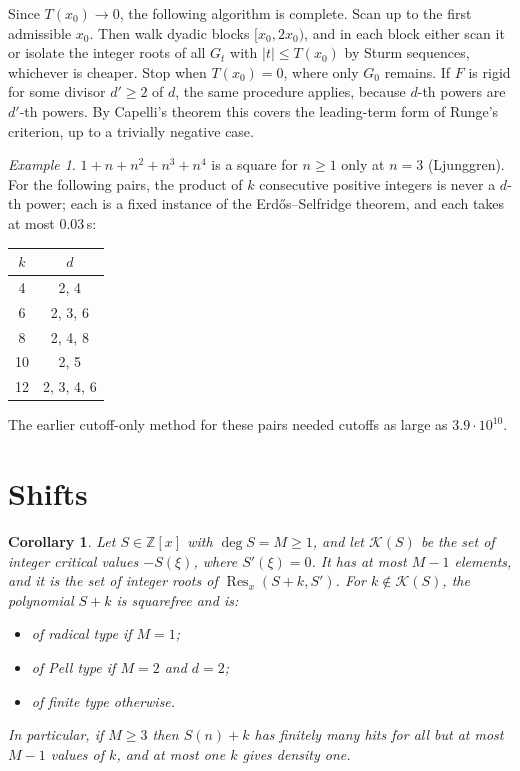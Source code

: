 \documentclass[11pt]{amsart}
\newtheorem{corollary}[theorem]{Corollary}
\theoremstyle{definition}
\theoremstyle{remark}
\newtheorem{example}[theorem]{Example}
\newcommand{\Z}{\mathbb{Z}}
\begin{document}
Since $T(x_0)\to0$, the following algorithm is complete. Scan up to the first admissible $x_0$. Then walk dyadic blocks $[x_0,2x_0)$, and in each block either scan it or isolate the integer roots of all $G_t$ with $|t|\le T(x_0)$ by Sturm sequences, whichever is cheaper. Stop when $T(x_0)=0$, where only $G_0$ remains. If $F$ is rigid for some divisor $d'\ge2$ of $d$, the same procedure applies, because $d$-th powers are $d'$-th powers. By Capelli's theorem this covers the leading-term form of Runge's criterion, up to a trivially negative case.

\begin{example}
$1+n+n^2+n^3+n^4$ is a square for $n\ge1$ only at $n=3$ (Ljunggren). For the following pairs, the product of $k$ consecutive positive integers is never a $d$-th power; each is a fixed instance of the Erd\H{o}s--Selfridge theorem, and each takes at most $0.03$\,s:

\begin{center}
\begin{tabular}{@{}cc@{}}
\toprule
$k$ & $d$ \\
\midrule
4 & 2, 4 \\
6 & 2, 3, 6 \\
8 & 2, 4, 8 \\
10 & 2, 5 \\
12 & 2, 3, 4, 6 \\
\bottomrule
\end{tabular}
\end{center}

The earlier cutoff-only method for these pairs needed cutoffs as large as $3.9\cdot10^{10}$.
\end{example}

\section{Shifts}\label{sec:shift}

\begin{corollary}\label{cor:shift}
Let $S\in\Z[x]$ with $\deg S=M\ge1$, and let $\mathcal K(S)$ be the set of integer critical values $-S(\xi)$, where $S'(\xi)=0$. It has at most $M-1$ elements, and it is the set of integer roots of $\operatorname{Res}_x(S+k,S')$. For $k\notin\mathcal K(S)$, the polynomial $S+k$ is squarefree and is:
\begin{itemize}
\item of radical type if $M=1$;
\item of Pell type if $M=2$ and $d=2$;
\item of finite type otherwise.
\end{itemize}
In particular, if $M\ge3$ then $S(n)+k$ has finitely many hits for all but at most $M-1$ values of $k$, and at most one $k$ gives density one.
\end{corollary}
\end{document}
